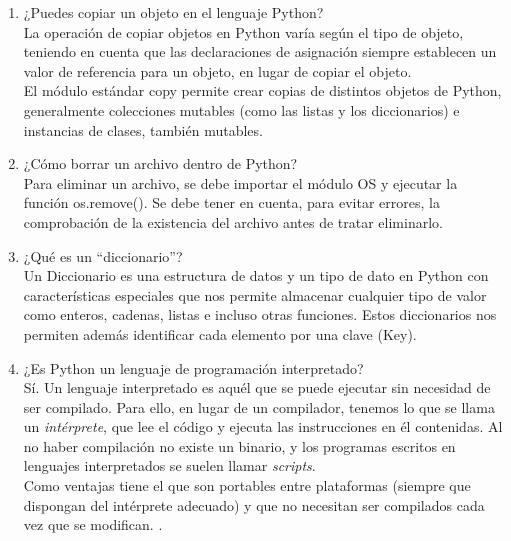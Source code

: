 \documentclass[a4paper,openright,12pt]{report}
\begin{document}
\begin{itemize}
\begin{enumerate}
			\item ¿Puedes copiar un objeto en el lenguaje Python?\\
			
			La operación de copiar objetos en Python varía según el tipo de objeto, teniendo en cuenta que las declaraciones de asignación siempre establecen un valor de referencia para un objeto, en lugar de copiar el objeto. \\
			
			El módulo estándar copy permite crear copias de distintos objetos de Python, generalmente colecciones mutables (como las listas y los diccionarios) e instancias de clases, también mutables.\\
			
			\item ¿Cómo borrar un archivo dentro de Python?\\
			
			Para eliminar un archivo, se debe importar el módulo OS y ejecutar la función os.remove(). Se debe tener en cuenta, para evitar errores, la comprobación de la existencia del archivo antes de tratar eliminarlo.\\
			
			
			\item ¿Qué es un ``diccionario''?\\
			
			Un Diccionario es una estructura de datos y un tipo de dato en Python con características especiales que nos permite almacenar cualquier tipo de valor como enteros, cadenas, listas e incluso otras funciones. Estos diccionarios nos permiten además identificar cada elemento por una clave (Key).\\
			
			\item ¿Es Python un lenguaje de programación interpretado?\\
			
			Sí. Un lenguaje interpretado es aquél que se puede ejecutar sin necesidad de ser compilado. Para ello, en lugar de un compilador, tenemos lo que se llama un \textit{intérprete}, que lee el código y ejecuta las instrucciones en él contenidas. Al no haber compilación no existe un binario, y los programas escritos en lenguajes interpretados se suelen llamar \textit{scripts}.\\
			
			Como ventajas tiene el que son portables entre plataformas (siempre que dispongan del intérprete adecuado) y que no necesitan ser compilados cada vez que se modifican. \cite{gutierrez2016python}.\\
			

\end{enumerate}
\end{itemize}
\end{document}
